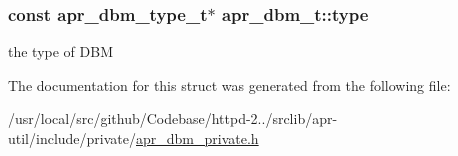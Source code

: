 \subsubsection[{\texorpdfstring{type}{type}}]{\setlength{\rightskip}{0pt plus 5cm}const {\bf apr\+\_\+dbm\+\_\+type\+\_\+t}$\ast$ apr\+\_\+dbm\+\_\+t\+::type}\hypertarget{structapr__dbm__t_a27287213e7ebe16d9945207a13300faf}{}\label{structapr__dbm__t_a27287213e7ebe16d9945207a13300faf}
the type of D\+BM 

The documentation for this struct was generated from the following file\+:\begin{DoxyCompactItemize}
\item 
/usr/local/src/github/\+Codebase/httpd-\/2../srclib/apr-\/util/include/private/\hyperlink{apr__dbm__private_8h}{apr\+\_\+dbm\+\_\+private.\+h}\end{DoxyCompactItemize}
